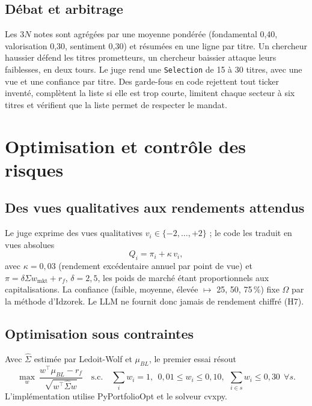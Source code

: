 \documentclass[11pt,a4paper]{report}
\begin{document}
\section{Débat et arbitrage}
Les $3N$ notes sont agrégées par une moyenne pondérée (fondamental 0{,}40, valorisation 0{,}30, sentiment 0{,}30)
et résumées en une ligne par titre. Un chercheur haussier défend les titres prometteurs, un chercheur baissier
attaque leurs faiblesses, en deux tours. Le juge rend une \texttt{Selection} de 15 à 30 titres, avec une vue et une
confiance par titre. Des garde-fous en code rejettent tout ticker inventé, complètent la liste si elle est trop
courte, limitent chaque secteur à six titres et vérifient que la liste permet de respecter le mandat.

\chapter{Optimisation et contrôle des risques}\label{ch:optim}

\section{Des vues qualitatives aux rendements attendus}
Le juge exprime des vues qualitatives $v_i\in\{-2,\dots,+2\}$ ; le code les traduit en vues absolues
\begin{equation}
  Q_i = \pi_i + \kappa\, v_i ,
\end{equation}
avec $\kappa = 0{,}03$ (rendement excédentaire annuel par point de vue) et $\pi = \delta\Sigma w_{\text{mkt}} + r_f$,
$\delta = 2{,}5$, les poids de marché étant proportionnels aux capitalisations. La confiance (faible, moyenne,
élevée $\mapsto$ 25, 50, 75\,\%) fixe $\Omega$ par la méthode d'Idzorek. Le LLM ne fournit donc jamais de
rendement chiffré (H7).

\section{Optimisation sous contraintes}
Avec $\hat\Sigma$ estimée par Ledoit-Wolf et $\mu_{BL}$, le premier essai résout
\begin{equation}
  \max_{w}\ \frac{w^\top\mu_{BL} - r_f}{\sqrt{w^\top\hat\Sigma w}}
  \quad\text{s.c.}\quad \sum_i w_i = 1,\ \ 0{,}01 \le w_i \le 0{,}10,\ \ \sum_{i\in s} w_i \le 0{,}30\ \ \forall s .
\end{equation}
L'implémentation utilise PyPortfolioOpt et le solveur cvxpy.
\end{document}
